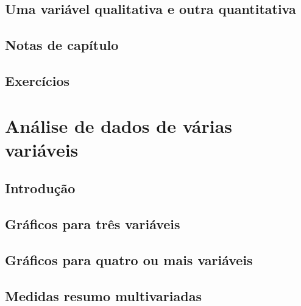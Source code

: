 \documentclass[
]{latex/krantz}
\theoremstyle{definition}
\theoremstyle{definition}
\theoremstyle{definition}
\theoremstyle{definition}
\theoremstyle{remark}
\begin{document}
\hypertarget{uma-variuxe1vel-qualitativa-e-outra-quantitativa}{%
\section{Uma variável qualitativa e outra quantitativa}\label{uma-variuxe1vel-qualitativa-e-outra-quantitativa}}

\hypertarget{notas-de-capuxedtulo-2}{%
\section{Notas de capítulo}\label{notas-de-capuxedtulo-2}}

\hypertarget{exercuxedcios-2}{%
\section{Exercícios}\label{exercuxedcios-2}}

\hypertarget{anuxe1lise-de-dados-de-vuxe1rias-variuxe1veis}{%
\chapter{Análise de dados de várias variáveis}\label{anuxe1lise-de-dados-de-vuxe1rias-variuxe1veis}}

\hypertarget{introduuxe7uxe3o-3}{%
\section{Introdução}\label{introduuxe7uxe3o-3}}

\hypertarget{gruxe1ficos-para-truxeas-variuxe1veis}{%
\section{Gráficos para três variáveis}\label{gruxe1ficos-para-truxeas-variuxe1veis}}

\hypertarget{gruxe1ficos-para-quatro-ou-mais-variuxe1veis}{%
\section{Gráficos para quatro ou mais variáveis}\label{gruxe1ficos-para-quatro-ou-mais-variuxe1veis}}

\hypertarget{medidas-resumo-multivariadas}{%
\section{Medidas resumo multivariadas}\label{medidas-resumo-multivariadas}}
\end{document}
